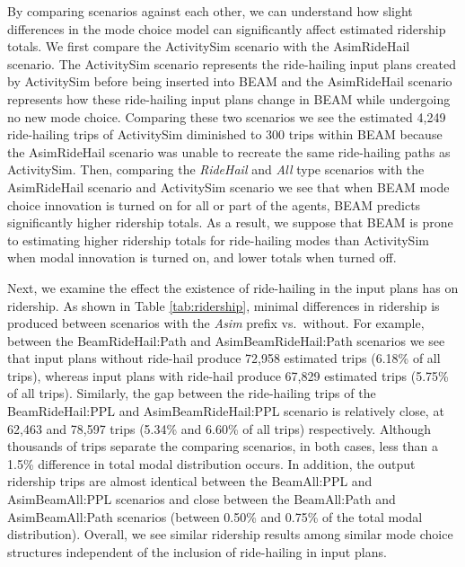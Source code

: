 \documentclass[fancy, masters]{byuthesis}
\begin{document}
By comparing scenarios against each other, we can understand how slight differences in the mode choice model can significantly affect estimated ridership totals. We first compare the ActivitySim scenario with the AsimRideHail scenario. The ActivitySim scenario represents the ride-hailing input plans created by ActivitySim before being inserted into BEAM and the AsimRideHail scenario represents how these ride-hailing input plans change in BEAM while undergoing no new mode choice. Comparing these two scenarios we see the estimated 4,249 ride-hailing trips of ActivitySim diminished to 300 trips within BEAM because the AsimRideHail scenario was unable to recreate the same ride-hailing paths as ActivitySim. Then, comparing the \emph{RideHail} and \emph{All} type scenarios with the AsimRideHail scenario and ActivitySim scenario we see that when BEAM mode choice innovation is turned on for all or part of the agents, BEAM predicts significantly higher ridership totals. As a result, we suppose that BEAM is prone to estimating higher ridership totals for ride-hailing modes than ActivitySim when modal innovation is turned on, and lower totals when turned off.

Next, we examine the effect the existence of ride-hailing in the input plans has on ridership. As shown in Table \ref{tab:ridership}, minimal differences in ridership is produced between scenarios with the \emph{Asim} prefix vs.~without. For example, between the BeamRideHail:Path and AsimBeamRideHail:Path scenarios we see that input plans without ride-hail produce 72,958 estimated trips (6.18\% of all trips), whereas input plans with ride-hail produce 67,829 estimated trips (5.75\% of all trips). Similarly, the gap between the ride-hailing trips of the BeamRideHail:PPL and AsimBeamRideHail:PPL scenario is relatively close, at 62,463 and 78,597 trips (5.34\% and 6.60\% of all trips) respectively. Although thousands of trips separate the comparing scenarios, in both cases, less than a 1.5\% difference in total modal distribution occurs. In addition, the output ridership trips are almost identical between the BeamAll:PPL and AsimBeamAll:PPL scenarios and close between the BeamAll:Path and AsimBeamAll:Path scenarios (between 0.50\% and 0.75\% of the total modal distribution). Overall, we see similar ridership results among similar mode choice structures independent of the inclusion of ride-hailing in input plans.
\end{document}
